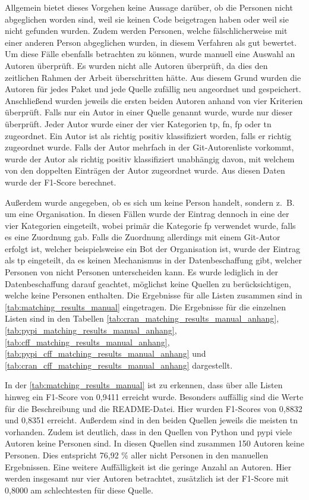 Allgemein bietet dieses Vorgehen keine Aussage darüber, ob die Personen nicht abgeglichen worden sind, weil sie keinen Code beigetragen haben oder weil sie nicht gefunden wurden.
Zudem werden Personen, welche fälschlicherweise mit einer anderen Person abgeglichen wurden, in diesem Verfahren als gut bewertet.
Um diese Fälle ebenfalls betrachten zu können, wurde manuell eine Auswahl an Autoren überprüft.
Es wurden nicht alle Autoren überprüft, da dies den zeitlichen Rahmen der Arbeit überschritten hätte.
Aus diesem Grund wurden die Autoren für jedes Paket und jede Quelle zufällig neu angeordnet und gespeichert.
Anschließend wurden jeweils die ersten beiden Autoren anhand von vier Kriterien überprüft.
Falls nur ein Autor in einer Quelle genannt wurde, wurde nur dieser überprüft.
Jeder Autor wurde einer der vier Kategorien \gls{tp}, \gls{fn}, \gls{fp} oder \gls{tn} zugeordnet.
Ein Autor ist als richtig positiv klassifiziert worden, falls er richtig zugeordnet wurde.
Falls der Autor mehrfach in der Git-Autorenliste vorkommt, wurde der Autor als richtig positiv klassifiziert unabhängig davon, mit welchem von den doppelten Einträgen der Autor zugeordnet wurde.
Aus diesen Daten wurde der F1-Score berechnet.

Außerdem wurde angegeben, ob es sich um keine Person handelt, sondern z. B. um eine Organisation.
In diesen Fällen wurde der Eintrag dennoch in eine der vier Kategorien eingeteilt, wobei primär die Kategorie \gls{fp} verwendet wurde, falls es eine Zuordnung gab.
Falls die Zuordnung allerdings mit einem Git-Autor erfolgt ist, welcher beispielsweise ein Bot der Organisation ist, wurde der Eintrag als \gls{tp} eingeteilt, da es keinen Mechanismus in der Datenbeschaffung gibt, welcher Personen von nicht Personen unterscheiden kann.
Es wurde lediglich in der Datenbeschaffung darauf geachtet, möglichst keine Quellen zu berücksichtigen, welche keine Personen enthalten.
Die Ergebnisse für alle Listen zusammen sind in \autoref{tab:matching_results_manual} eingetragen.
Die Ergebnisse für die einzelnen Listen sind in den Tabellen \ref{tab:cran_matching_results_manual_anhang}, \ref{tab:pypi_matching_results_manual_anhang}, \ref{tab:cff_matching_results_manual_anhang}, \ref{tab:pypi_cff_matching_results_manual_anhang} und \ref{tab:cran_cff_matching_results_manual_anhang} dargestellt.

In der \autoref{tab:matching_results_manual} ist zu erkennen, dass über alle Listen hinweg ein F1-Score von 0,9411 erreicht wurde.
Besonders auffällig sind die Werte für die Beschreibung und die README-Datei.
Hier wurden F1-Scores von 0,8832 und 0,8351 erreicht.
Außerdem sind in den beiden Quellen jeweils die meisten \gls{tn} vorhanden.
Zudem ist deutlich, dass in den Quellen von Python und \gls{pypi} viele Autoren keine Personen sind.
In diesen Quellen sind zusammen 150 Autoren keine Personen.
Dies entspricht 76,92 \% aller nicht Personen in den manuellen Ergebnissen.
Eine weitere Auffälligkeit ist die geringe Anzahl an  Autoren.
Hier werden insgesamt nur vier Autoren betrachtet, zusätzlich ist der F1-Score mit 0,8000 am schlechtesten für diese Quelle.

